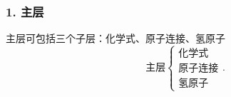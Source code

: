 {}
\subsubsection*{1. 主层}%
\label{subsub:1. 主层}
主层可包括三个子层：化学式、原子连接、氢原子
\[
    \text{主层}
    \begin{cases}
        \text{化学式}\\
        \text{原子连接}\\
        \text{氢原子}
    \end{cases}
.\] 
